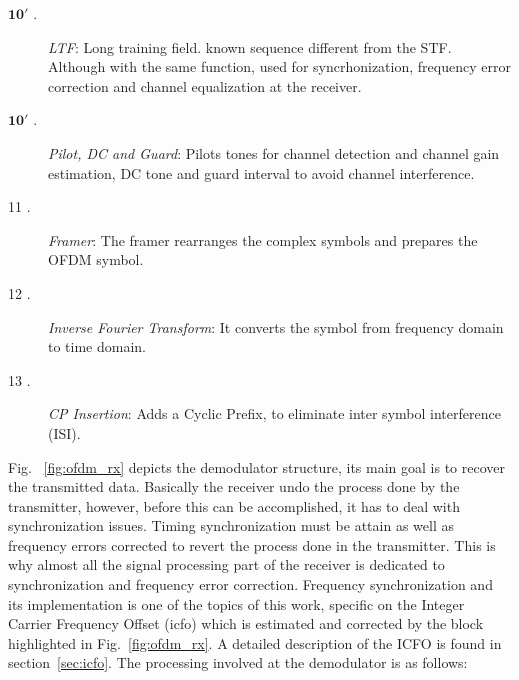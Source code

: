 \begin{itemize}
\begin{description}
\item [$\boldsymbol{10'}$ .] \emph{LTF}: Long training field. known sequence different from the STF. Although with the same function, used for syncrhonization, frequency error correction and channel equalization at the receiver.

\item [$\boldsymbol{10'}$ .] \emph{Pilot, DC and Guard}: Pilots tones for channel detection and channel gain estimation, DC tone and guard interval to avoid channel interference.  

\item [11 .] \emph{Framer}: The framer rearranges the complex symbols and prepares the OFDM symbol. 

\item [12 .] \emph{Inverse Fourier Transform}: It converts the symbol from frequency domain  to time domain. 

\item [13 .] \emph{CP Insertion}: Adds a Cyclic Prefix, to eliminate inter symbol interference (ISI).

\end{description}

\end{itemize}




Fig. ~\ref{fig:ofdm_rx} depicts the demodulator structure, its main goal is to   
recover the transmitted data. Basically the receiver undo the process done by the transmitter, however, before this can be accomplished, it has to deal with synchronization issues. Timing synchronization must be attain as well as frequency errors corrected to revert the process done in the transmitter. This is why almost all the signal processing part of the receiver is dedicated to synchronization and frequency error correction. Frequency synchronization and its implementation is one of the topics of this work, specific on the Integer Carrier Frequency Offset (\ac{icfo}) which is estimated and corrected by the block highlighted in Fig.~\ref{fig:ofdm_rx}. A detailed description of the ICFO is found in section~\ref{sec:icfo}. The processing involved at the demodulator is as follows:


